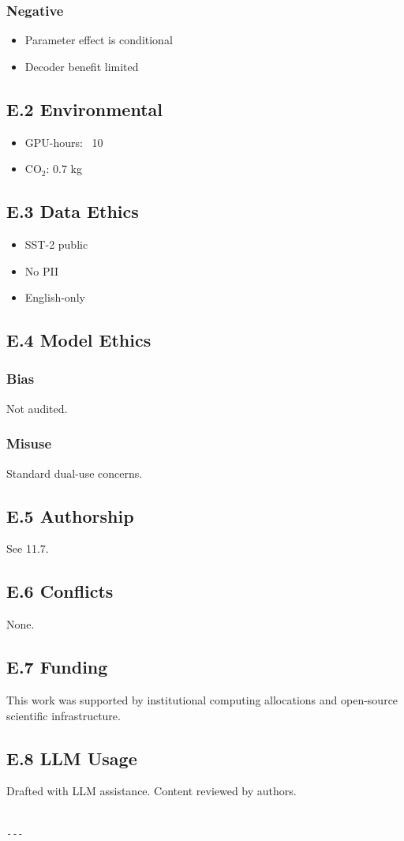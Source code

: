 \subsubsection{Negative}
\begin{itemize}
\item Parameter effect is conditional
\item Decoder benefit limited

\end{itemize}
\subsection{E.2 Environmental}

\begin{itemize}
\item GPU-hours: ~10
\item CO$_2$: 0.7 kg

\end{itemize}
\subsection{E.3 Data Ethics}

\begin{itemize}
\item SST-2 public
\item No PII
\item English-only

\end{itemize}
\subsection{E.4 Model Ethics}

\subsubsection{Bias}
Not audited.

\subsubsection{Misuse}
Standard dual-use concerns.

\subsection{E.5 Authorship}

See  11.7.

\subsection{E.6 Conflicts}

None.

\subsection{E.7 Funding}

This work was supported by institutional computing allocations and open-source scientific infrastructure.

\subsection{E.8 LLM Usage}

Drafted with LLM assistance. Content reviewed by authors.
\begin{lstlisting}

---
\end{lstlisting}